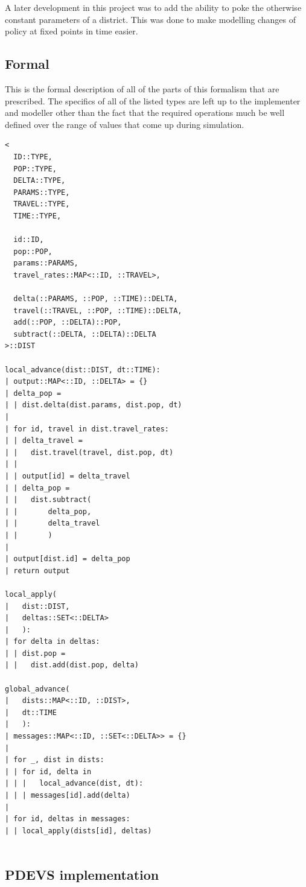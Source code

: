 \documentclass[twocolumn]{article}
\begin{document}
A later development in this project was to add the ability to poke the otherwise constant parameters of a district. This was done to make modelling changes of policy at fixed points in time easier.

\subsection{Formal}

This is the formal description of all of the parts of this formalism that are prescribed. The specifics of all of the listed types are left up to the implementer and modeller other than the fact that the required operations much be well defined over the range of values that come up during simulation.

\begin{verbatim}
<
  ID::TYPE, 
  POP::TYPE, 
  DELTA::TYPE, 
  PARAMS::TYPE, 
  TRAVEL::TYPE, 
  TIME::TYPE,
  
  id::ID, 
  pop::POP, 
  params::PARAMS, 
  travel_rates::MAP<::ID, ::TRAVEL>, 
  
  delta(::PARAMS, ::POP, ::TIME)::DELTA, 
  travel(::TRAVEL, ::POP, ::TIME)::DELTA, 
  add(::POP, ::DELTA)::POP, 
  subtract(::DELTA, ::DELTA)::DELTA
>::DIST

local_advance(dist::DIST, dt::TIME):
| output::MAP<::ID, ::DELTA> = {}
| delta_pop = 
| | dist.delta(dist.params, dist.pop, dt)
| 
| for id, travel in dist.travel_rates:
| | delta_travel = 
| |   dist.travel(travel, dist.pop, dt)
| | 
| | output[id] = delta_travel
| | delta_pop = 
| |   dist.subtract(
| |       delta_pop, 
| |       delta_travel
| |       )
| 
| output[dist.id] = delta_pop
| return output
  
local_apply(
|   dist::DIST, 
|   deltas::SET<::DELTA>
|   ):
| for delta in deltas:
| | dist.pop = 
| |   dist.add(dist.pop, delta)

global_advance(
|   dists::MAP<::ID, ::DIST>, 
|   dt::TIME
|   ):
| messages::MAP<::ID, ::SET<::DELTA>> = {}
| 
| for _, dist in dists:
| | for id, delta in 
| | |   local_advance(dist, dt):
| | | messages[id].add(delta)
| 
| for id, deltas in messages:
| | local_apply(dists[id], deltas)
 
\end{verbatim}

\subsection{PDEVS implementation}
\end{document}
